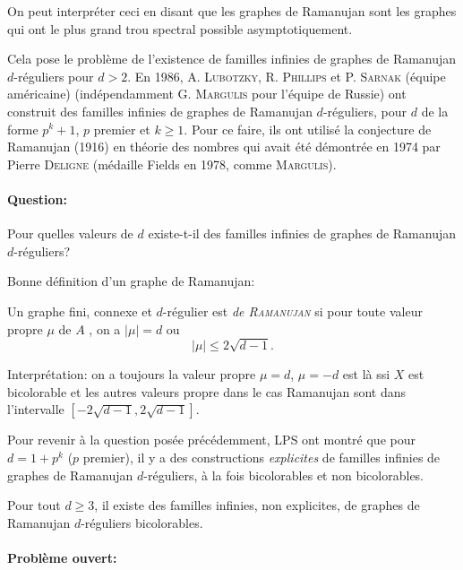On peut interpréter ceci en disant que les graphes de Ramanujan sont les graphes \og qui ont le plus grand
trou spectral possible\fg{} asymptotiquement.

Cela pose le problème de l'existence de familles infinies de graphes de Ramanujan $d$-réguliers pour $d >
2$. En 1986, A. \textsc{Lubotzky}, R. \textsc{Phillips} et P. \textsc{Sarnak} (équipe américaine) (indépendamment
G. \textsc{Margulis} pour l'équipe de Russie) ont construit des familles infinies de graphes de Ramanujan
$d$-réguliers, pour $d$ de la forme $p^{k}+1$, $p$ premier et $k \geq 1$. Pour ce faire, ils ont utilisé la
conjecture de Ramanujan (1916) en théorie des nombres qui avait été démontrée en 1974 par Pierre \textsc{Deligne}
(médaille Fields en 1978, comme \textsc{Margulis}).

\paragraph{Question:}

Pour quelles valeurs de $d$ existe-t-il des familles infinies de graphes de Ramanujan $d$-réguliers?


Bonne définition d'un graphe de Ramanujan: 
\begin{defi}
  \label{defi:graphe-de-ramanujan}
  Un graphe fini, connexe et $d$-régulier est \emph{de \textsc{Ramanujan}} si
  pour toute valeur propre $\mu$ de $A$ , on a $|\mu| = d$ ou 
  \[ |\mu| \leq 2 \sqrt{d - 1}. \]
\end{defi}

Interprétation: on a toujours la valeur propre $\mu = d$, $\mu = -d$ est là ssi $X$ est bicolorable et les autres
valeurs propre dans le cas Ramanujan sont dans l'intervalle $\left[-2\sqrt{d-1}, 2\sqrt{d-1}\right]$.

Pour revenir à la question posée précédemment, LPS ont montré que pour $d = 1 + p^k$ ($p$ premier), il y a des
constructions \textit{explicites} de familles infinies de graphes de Ramanujan $d$-réguliers, à la fois
bicolorables et non bicolorables.

\begin{theo}[MSS, 2013]
  Pour tout $d \geq 3$, il existe des familles infinies, non explicites, de graphes de Ramanujan $d$-réguliers bicolorables.
\end{theo}

\paragraph{Problème ouvert:}

